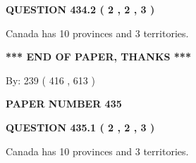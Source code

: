 \documentclass[12pt]{article}
\begin{document}
\vspace{0.2in}
  
{\textbf{\Large{QUESTION
434.2 
 ( 2 , 2 , 3 )
}}}
  
  
 
 
\noindent{}
 
 
Canada has 10  provinces and 3 territories.
 
 
 
 
   
   
 \vspace{0.2in}
 
   
   
   
   
\vspace{1.0in} 
{\textbf{\large{ *** END OF PAPER, THANKS *** }}} 
   
   
\hspace{1.0in} By: 
 239 ( 416 ,  613 )
   
   
   
   
\newpage 
\setcounter{page}{ 
   435001 } 
   
   
   
   
 {\textbf{ \Large{ PAPER NUMBER  435  }}}
   
   
\vspace{0.2in}
   
   
   
   
   
   
 \vspace{0.2in}
 
 
 
 
   
   
  
\vspace{0.2in}
  
{\textbf{\Large{QUESTION
435.1 
 ( 2 , 2 , 3 )
}}}
  
  
 
 
\noindent{}
 
 
Canada has 10  provinces and 3 territories.
 
 
 
 
  
\vspace{0.2in}
  
\end{document}
